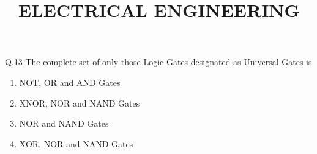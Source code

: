 \documentclass{article}
\title{ELECTRICAL ENGINEERING}
\date{}
\begin{document}
\maketitle

Q.13 The complete set of only those Logic Gates designated as Universal Gates is\\
\begin{enumerate}[label=(\Alph*)]
\item NOT, OR and AND Gates
\item XNOR, NOR and NAND Gates
\item NOR and NAND Gates
\item XOR, NOR and NAND Gates
\end{enumerate}
\end{document}
